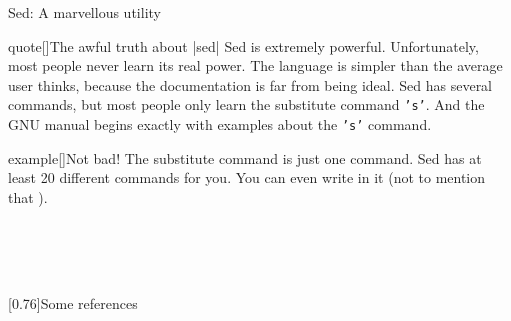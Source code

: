 
\makeatletter
{}
\makeatother
\begin{frame}{Sed: A marvellous utility}
    \vspace{-3mm}
    \begin{varblock}{quote}[\textwidth]{The awful truth about \bash|sed|}
        \textnormal{Sed is extremely powerful.
        Unfortunately, most people never learn its real power.
        The language is simpler than the average user thinks, because the documentation is far from being ideal.
        Sed has several commands, but most people only learn the substitute command \texttt{'s'}.
        And the GNU manual begins exactly with examples about the \texttt{'s'} command.}
    \end{varblock}
    \vspace{-1mm}
    \PrepareURLsymbol[PB]
    \begin{varblock}{example}[\textwidth]{Not bad!}
        The substitute command is just one command.
        Sed has at least 20 different commands for you.
        You can even write  in it (not to mention that ).
    \end{varblock}
    \vspace{-1mm}
    \begin{lrbox}{\tmpbox}
        \begin{minipage}{0.75\textwidth}
             \\
             \\
            \\
        \end{minipage}
    \end{lrbox}
    \begin{varblock*}{}[0.76\textwidth]{Some references}
        \usebox{\tmpbox}
    \end{varblock*}
\end{frame}
